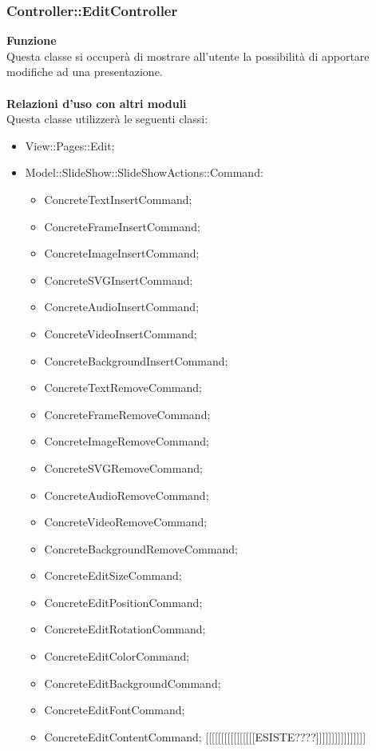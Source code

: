 {				\subsubsection{Controller::EditController}{
					\textbf{Funzione}\\
					\indent Questa classe si occuperà di mostrare all'utente la possibilità di apportare modifiche ad una presentazione.\\\\
					\textbf{Relazioni d'uso con altri moduli}\\
					\indent Questa classe utilizzerà le seguenti classi:
					\begin{itemize}
						\item View::Pages::Edit;
						\item Model::SlideShow::SlideShowActions::Command:
						\begin{itemize}
							\item ConcreteTextInsertCommand;
							\item ConcreteFrameInsertCommand;
							\item ConcreteImageInsertCommand;
							\item ConcreteSVGInsertCommand;
							\item ConcreteAudioInsertCommand;
							\item ConcreteVideoInsertCommand;
							\item ConcreteBackgroundInsertCommand;
							\item ConcreteTextRemoveCommand;
							\item ConcreteFrameRemoveCommand;
							\item ConcreteImageRemoveCommand;
							\item ConcreteSVGRemoveCommand;
							\item ConcreteAudioRemoveCommand;
							\item ConcreteVideoRemoveCommand;
							\item ConcreteBackgroundRemoveCommand;
							\item ConcreteEditSizeCommand;
							\item ConcreteEditPositionCommand;
							\item ConcreteEditRotationCommand;
							\item ConcreteEditColorCommand;
							\item ConcreteEditBackgroundCommand;
							\item ConcreteEditFontCommand;
							\item ConcreteEditContentCommand; [[[[[[[[[[[[[[[[ESISTE????]]]]]]]]]]]]]]]]

\end{itemize}
\end{itemize}}}
